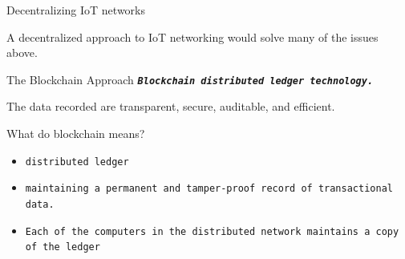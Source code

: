 \documentclass[10pt]{beamer}
\begin{document}
{
\begin{frame}{Decentralizing IoT networks}

      A decentralized approach to IoT networking
would solve many of the issues above.

\end{frame}
}

{

\begin{frame}{The Blockchain Approach}
	\texttt{\textbf{\textit{Blockchain distributed ledger technology.}}}

The data recorded are transparent, secure, auditable, and efficient.
      \begin{alertblock}{What do blockchain means?}
        \begin{itemize}
        \item \texttt{distributed ledger}
        \item \texttt{maintaining a permanent and tamper-proof record of transactional data.}
        \item \texttt{Each of the computers in the distributed network maintains a copy of the ledger}
        \end{itemize}
      \end{alertblock}

\end{frame}
}
\end{document}
